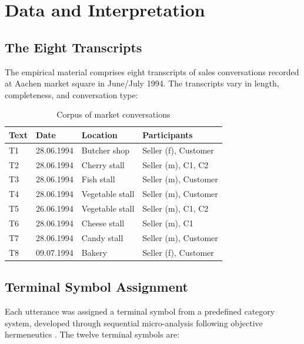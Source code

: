 \documentclass[12pt,a4paper]{article}
\begin{document}
\section{Data and Interpretation}

\subsection{The Eight Transcripts}

The empirical material comprises eight transcripts of sales conversations recorded
at Aachen market square in June/July 1994. The transcripts vary in length,
completeness, and conversation type:

\begin{table}[H]
\centering
\caption{Corpus of market conversations}
\label{tab:corpus}
\begin{tabular}{@{} l l l l @{}}
\toprule
\textbf{Text} & \textbf{Date} & \textbf{Location} & \textbf{Participants} \\
\midrule
T1 & 28.06.1994 & Butcher shop & Seller (f), Customer \\
T2 & 28.06.1994 & Cherry stall & Seller (m), C1, C2 \\
T3 & 28.06.1994 & Fish stall & Seller (m), Customer \\
T4 & 28.06.1994 & Vegetable stall & Seller (m), Customer \\
T5 & 26.06.1994 & Vegetable stall & Seller (m), C1, C2 \\
T6 & 28.06.1994 & Cheese stall & Seller (m), C1 \\
T7 & 28.06.1994 & Candy stall & Seller (m), Customer \\
T8 & 09.07.1994 & Bakery & Seller (f), Customer \\
\bottomrule
\end{tabular}
\end{table}

\subsection{Terminal Symbol Assignment}

Each utterance was assigned a terminal symbol from a predefined category system,
developed through sequential micro-analysis following objective hermeneutics
\citep{oevermann1979methodology}. The twelve terminal symbols are:
\end{document}
